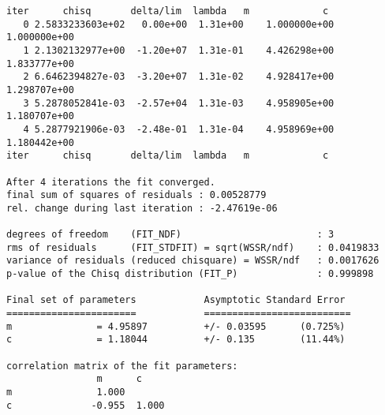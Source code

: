     \begin{verbatim}
iter      chisq       delta/lim  lambda   m             c            
   0 2.5833233603e+02   0.00e+00  1.31e+00    1.000000e+00   1.000000e+00
   1 2.1302132977e+00  -1.20e+07  1.31e-01    4.426298e+00   1.833777e+00
   2 6.6462394827e-03  -3.20e+07  1.31e-02    4.928417e+00   1.298707e+00
   3 5.2878052841e-03  -2.57e+04  1.31e-03    4.958905e+00   1.180707e+00
   4 5.2877921906e-03  -2.48e-01  1.31e-04    4.958969e+00   1.180442e+00
iter      chisq       delta/lim  lambda   m             c            

After 4 iterations the fit converged.
final sum of squares of residuals : 0.00528779
rel. change during last iteration : -2.47619e-06

degrees of freedom    (FIT_NDF)                        : 3
rms of residuals      (FIT_STDFIT) = sqrt(WSSR/ndf)    : 0.0419833
variance of residuals (reduced chisquare) = WSSR/ndf   : 0.0017626
p-value of the Chisq distribution (FIT_P)              : 0.999898

Final set of parameters            Asymptotic Standard Error
=======================            ==========================
m               = 4.95897          +/- 0.03595      (0.725%)
c               = 1.18044          +/- 0.135        (11.44%)

correlation matrix of the fit parameters:
                m      c      
m               1.000 
c              -0.955  1.000
    \end{verbatim}
